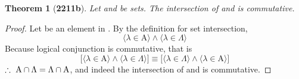 \documentclass[preview]{standalone}
\newtheorem{theorem}{Theorem}
\begin{document}
\begin{theorem}[\textbf{2211b}]
    Let  and \bm{$\Lambda$} be sets. 
    The intersection of  and \bm{$\Lambda$} is commutative.
\end{theorem}
\begin{proof}
    Let \bm{$\lambda$} be an element in . 
    By the definition for set intersection, 
    \begin{equation*}
        \Big \langle \lambda \in \mathrm{A} \Big \rangle 
            \land 
        \Big \langle \lambda \in \Lambda \Big \rangle
    \end{equation*}
    Because logical conjunction is commutative, that is
    \begin{equation*}
        \Bigg[
            \Big \langle \lambda \in \mathrm{A} \Big \rangle 
                \land 
            \Big \langle \lambda \in \Lambda \Big \rangle
        \Bigg]
            \equiv
        \Bigg[
            \Big \langle \lambda \in \Lambda \Big \rangle 
                \land 
            \Big \langle \lambda \in \mathrm{A} \Big \rangle
        \Bigg]
    \end{equation*}
    $\therefore \text{\space} 
    \relax{\mathrm{A} \cap \Lambda = \Lambda \cap \mathrm{A}}$, 
    and indeed the intersection of  and \bm{$\Lambda$} is commutative.
\end{proof}
\end{document}
